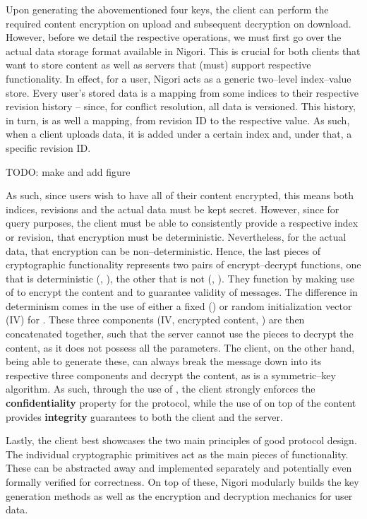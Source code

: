 Upon generating the abovementioned four keys, the client can perform the required content encryption on upload and subsequent decryption on download.
However, before we detail the respective operations, we must first go over the actual data storage format available in Nigori.
This is crucial for both clients that want to store content as well as servers that (must) support respective functionality.
In effect, for a user, Nigori acts as a generic two--level index--value store.
Every user's stored data is a mapping from some indices to their respective revision history -- since, for conflict resolution, all data is versioned.
This history, in turn, is as well a mapping, from revision ID to the respective value.
As such, when a client uploads data, it is added under a certain index and, under that, a specific revision ID.

TODO: make and add figure

As such, since users wish to have all of their content encrypted, this means both indices, revisions and the actual data must be kept secret.
However, since for query purposes, the client must be able to consistently provide a respective index or revision, that encryption must be deterministic.
Nevertheless, for the actual data, that encryption can be non--deterministic.
Hence, the last pieces of cryptographic functionality represents two pairs of encrypt--decrypt functions, one that is deterministic (, ), the other that is not (, ).
They function by making use of  to encrypt the content and  to guarantee validity of messages.
The difference in determinism comes in the use of either a fixed () or random initialization vector (IV) for .
These three components (IV, encrypted content, ) are then concatenated together, such that the server cannot use the pieces to decrypt the content, as it does not possess all the  parameters.
The client, on the other hand, being able to generate these, can always break the message down into its respective three components and decrypt the content, as  is a symmetric--key algorithm.
As such, through the use of , the client strongly enforces the \textbf{confidentiality} property for the protocol, while the use of  on top of the content provides \textbf{integrity} guarantees to both the client and the server.

Lastly, the client best showcases the two main principles of good protocol design.
The individual cryptographic primitives act as the main pieces of functionality.
These can be abstracted away and implemented separately and potentially even formally verified for correctness.
On top of these, Nigori modularly builds the key generation methods as well as the encryption and decryption mechanics for user data.

